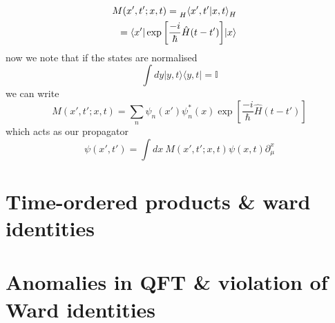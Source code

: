 \documentclass[11pt, a4paper]{article}
\theoremstyle{definition}
\theoremstyle{plain}
\begin{document}
\begin{align*}
  \begin{split}
  M(x', t'; x, t) &= \prescript{}{H}{\braket{x',t'|x, t}_{H}}
  \end{split} \\
  \begin{split}
  &= \braket{x'|\exp{\left[\frac{-i}{\hbar}\hat{H}(t-t')\right]}|x}
  \end{split}
\end{align*}\label{eq:1}
now we note that if the states are normalised
\begin{equation}
  \int{dy |y,t\rangle{} \langle{y,t|} } = \mathbb{I}
\end{equation}
we can write 
  \begin{equation}
    M(x', t'; x, t) = \sum_{n}{\psi_{n}(x')\psi_{n}^*(x)\exp{\left[\frac{-i}{\hbar}\hat{H}(t-t')\right]}}
  \end{equation}
which acts as our propagator
\begin{equation}
 \psi(x', t') = \int{dx \ M(x', t'; x, t) \psi(x, t)}
 \partial^{x}_{\mu}
\end{equation}

\section{Time-ordered products \& ward identities}
\section{Anomalies in QFT \& violation of Ward identities}

\newpage


\end{document}
